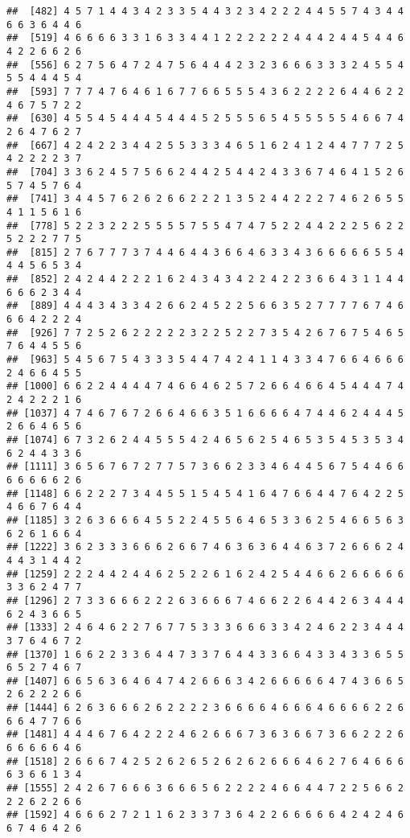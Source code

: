 \documentclass[
]{article}
\begin{document}
\begin{verbatim}
##  [482] 4 5 7 1 4 4 3 4 2 3 3 5 4 4 3 2 3 4 2 2 2 4 4 5 5 7 4 3 4 4 6 6 3 6 4 4 6
##  [519] 4 6 6 6 6 3 3 1 6 3 3 4 4 1 2 2 2 2 2 2 4 4 4 2 4 4 5 4 4 6 4 2 2 6 6 2 6
##  [556] 6 2 7 5 6 4 7 2 4 7 5 6 4 4 4 2 3 2 3 6 6 6 3 3 3 2 4 5 5 4 5 5 4 4 4 5 4
##  [593] 7 7 7 4 7 6 4 6 1 6 7 7 6 6 5 5 5 4 3 6 2 2 2 2 6 4 4 6 2 2 4 6 7 5 7 2 2
##  [630] 4 5 5 4 5 4 4 4 5 4 4 4 5 2 5 5 5 6 5 4 5 5 5 5 5 4 6 6 7 4 2 6 4 7 6 2 7
##  [667] 4 2 4 2 2 3 4 4 2 5 5 3 3 3 4 6 5 1 6 2 4 1 2 4 4 7 7 7 2 5 4 2 2 2 2 3 7
##  [704] 3 3 6 2 4 5 7 5 6 6 2 4 4 2 5 4 4 2 4 3 3 6 7 4 6 4 1 5 2 6 5 7 4 5 7 6 4
##  [741] 3 4 4 5 7 6 2 6 2 6 6 2 2 2 1 3 5 2 4 4 2 2 2 7 4 6 2 6 5 5 4 1 1 5 6 1 6
##  [778] 5 2 2 3 2 2 2 5 5 5 5 7 5 5 4 7 4 7 5 2 2 4 4 2 2 2 5 6 2 2 5 2 2 2 7 7 5
##  [815] 2 7 6 7 7 7 3 7 4 4 6 4 4 3 6 6 4 6 3 3 4 3 6 6 6 6 6 5 5 4 4 4 5 6 5 3 4
##  [852] 2 4 2 4 4 2 2 2 1 6 2 4 3 4 3 4 2 2 4 2 2 3 6 6 4 3 1 1 4 4 6 6 6 2 3 4 4
##  [889] 4 4 4 3 4 3 3 4 2 6 6 2 4 5 2 2 5 6 6 3 5 2 7 7 7 7 6 7 4 6 6 6 4 2 2 2 4
##  [926] 7 7 2 5 2 6 2 2 2 2 2 3 2 2 5 2 2 7 3 5 4 2 6 7 6 7 5 4 6 5 7 6 4 4 5 5 6
##  [963] 5 4 5 6 7 5 4 3 3 3 5 4 4 7 4 2 4 1 1 4 3 3 4 7 6 6 4 6 6 6 2 4 6 6 4 5 5
## [1000] 6 6 2 2 4 4 4 4 7 4 6 6 4 6 2 5 7 2 6 6 4 6 6 4 5 4 4 4 7 4 2 4 2 2 2 1 6
## [1037] 4 7 4 6 7 6 7 2 6 6 4 6 6 3 5 1 6 6 6 6 4 7 4 4 6 2 4 4 4 5 2 6 6 4 6 5 6
## [1074] 6 7 3 2 6 2 4 4 5 5 5 4 2 4 6 5 6 2 5 4 6 5 3 5 4 5 3 5 3 4 6 2 4 4 3 3 6
## [1111] 3 6 5 6 7 6 7 2 7 7 5 7 3 6 6 2 3 3 4 6 4 4 5 6 7 5 4 4 6 6 6 6 6 6 6 2 6
## [1148] 6 6 2 2 2 7 3 4 4 5 5 1 5 4 5 4 1 6 4 7 6 6 4 4 7 6 4 2 2 5 4 6 6 7 6 4 4
## [1185] 3 2 6 3 6 6 6 4 5 5 2 2 4 5 5 6 4 6 5 3 3 6 2 5 4 6 6 5 6 3 6 2 6 1 6 6 4
## [1222] 3 6 2 3 3 3 6 6 6 2 6 6 7 4 6 3 6 3 6 4 4 6 3 7 2 6 6 6 2 4 4 4 3 1 4 4 2
## [1259] 2 2 2 4 4 2 4 4 6 2 5 2 2 6 1 6 2 4 2 5 4 4 6 6 2 6 6 6 6 6 3 3 6 2 4 7 7
## [1296] 2 7 3 3 6 6 6 2 2 2 6 3 6 6 6 7 4 6 6 2 2 6 4 4 2 6 3 4 4 4 6 2 4 3 6 6 5
## [1333] 2 4 6 4 6 2 2 7 6 7 7 5 3 3 3 6 6 6 3 3 4 2 4 6 2 2 3 4 4 4 3 7 6 4 6 7 2
## [1370] 1 6 6 2 2 3 3 6 4 4 7 3 3 7 6 4 4 3 3 6 6 4 3 3 4 3 3 6 5 5 6 5 2 7 4 6 7
## [1407] 6 6 5 6 3 6 4 6 4 7 4 2 6 6 6 3 4 2 6 6 6 6 6 4 7 4 3 6 6 5 2 6 2 2 2 6 6
## [1444] 6 2 6 3 6 6 6 2 6 2 2 2 2 3 6 6 6 6 4 6 6 6 4 6 6 6 6 2 2 6 6 6 4 7 7 6 6
## [1481] 4 4 4 6 7 6 4 2 2 2 4 6 2 6 6 6 7 3 6 3 6 6 7 3 6 6 2 2 2 6 6 6 6 6 6 4 6
## [1518] 2 6 6 6 7 4 2 5 2 6 2 6 5 2 6 2 6 2 6 6 6 4 6 2 7 6 4 6 6 6 6 3 6 6 1 3 4
## [1555] 2 4 2 6 7 6 6 6 3 6 6 6 5 6 2 2 2 2 4 6 6 4 4 7 2 2 5 6 6 2 2 2 6 2 2 6 6
## [1592] 4 6 6 6 2 7 2 1 1 6 2 3 3 7 3 6 4 2 2 6 6 6 6 6 4 2 4 2 4 6 6 7 4 6 4 2 6

\end{verbatim}
\end{document}
